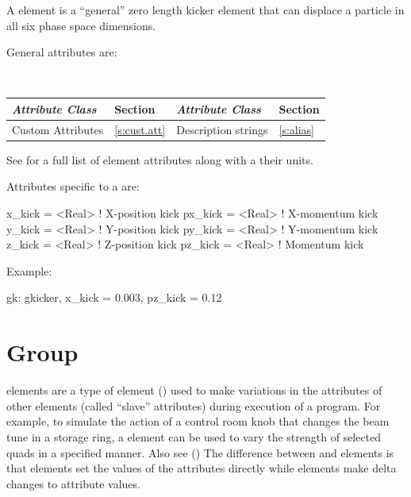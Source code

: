 A  element is a ``general'' zero length kicker element that can displace
a particle in all six phase space dimensions.

General  attributes are:
\begin{center}
\tt
\begin{tabular}{llll} \toprule
  {\sl Attribute Class}      & Section           & {\sl Attribute Class}      & Section         \\ \midrule
  Custom Attributes          & \ref{s:cust.att}  & Description strings        & \ref{s:alias}   \\ 
  \bottomrule
\end{tabular}
\end{center}
\toffset
See  for a full list of element attributes along with a their units.

Attributes specific to a  are:
\begin{example}
  x_kick        = <Real>  ! X-position kick
  px_kick       = <Real>  ! X-momentum kick
  y_kick        = <Real>  ! Y-position kick
  py_kick       = <Real>  ! Y-momentum kick
  z_kick        = <Real>  ! Z-position kick
  pz_kick       = <Real>  ! Momentum kick
\end{example}

Example:
\begin{example}
  gk: gkicker, x_kick = 0.003, pz_kick = 0.12
\end{example}

\newpage

\section{Group}
\label{s:group}

 elements are a type of  element () used to make variations
in the attributes of other elements (called ``slave'' attributes) during execution of a program. For
example, to simulate the action of a control room knob that changes the beam tune in a storage ring,
a  element can be used to vary the strength of selected quads in a specified manner. Also
see  () The difference between  and  elements is
that  elements set the values of the attributes directly while  elements make
delta changes to attribute values.

